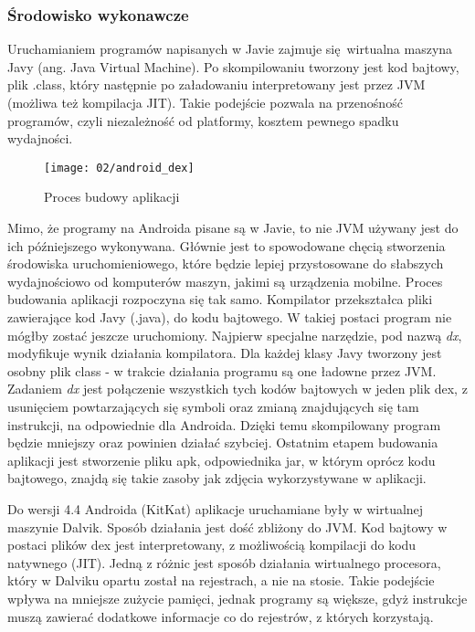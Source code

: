 \subsubsection*{Środowisko wykonawcze}
Uruchamianiem programów napisanych w Javie zajmuje się wirtualna maszyna Javy (ang. Java Virtual Machine). Po skompilowaniu tworzony jest kod bajtowy, plik .class, który następnie po załadowaniu interpretowany jest przez JVM (możliwa też kompilacja JIT). Takie podejście pozwala na przenośność programów, czyli niezależność od platformy, kosztem pewnego spadku wydajności.

\begin{wrapfigure}[5]{r}{0.5\textwidth}
	\vspace{-15pt}
	\begin{center}
		\texttt{[image: 02/android\_dex]}
	\end{center}
	\vspace{-10pt}
	\caption{Proces budowy aplikacji}
	\vspace{-10pt}
\end{wrapfigure}
Mimo, że programy na Androida pisane są w Javie, to nie JVM używany jest do ich późniejszego wykonywana. Głównie jest to spowodowane chęcią stworzenia środowiska uruchomieniowego, które będzie lepiej przystosowane do słabszych wydajnościowo od komputerów maszyn, jakimi są urządzenia mobilne. Proces budowania aplikacji rozpoczyna się tak samo. Kompilator przekształca pliki zawierające kod Javy (.java), do kodu bajtowego. W takiej postaci program nie mógłby zostać jeszcze uruchomiony. Najpierw specjalne narzędzie, pod nazwą \textit{dx}, modyfikuje wynik działania kompilatora. Dla każdej klasy Javy tworzony jest osobny plik class - w trakcie działania programu są one ładowne przez JVM. Zadaniem \textit{dx} jest połączenie wszystkich tych kodów bajtowych w jeden plik dex, z usunięciem powtarzających się symboli oraz zmianą znajdujących się tam instrukcji, na odpowiednie dla Androida. Dzięki temu skompilowany program będzie mniejszy oraz powinien działać szybciej. Ostatnim etapem budowania aplikacji jest stworzenie pliku apk, odpowiednika jar, w którym oprócz kodu bajtowego, znajdą się takie zasoby jak zdjęcia wykorzystywane w aplikacji.

Do wersji 4.4 Androida (KitKat) aplikacje uruchamiane były w wirtualnej maszynie Dalvik. Sposób działania jest dość zbliżony do JVM. Kod bajtowy w postaci plików dex jest interpretowany, z możliwością kompilacji do kodu natywnego (JIT). Jedną z różnic jest sposób działania wirtualnego procesora, który w Dalviku opartu został na rejestrach, a nie na stosie. Takie podejście wpływa na mniejsze zużycie pamięci, jednak programy są większe, gdyż instrukcje muszą zawierać dodatkowe informacje co do rejestrów, z których korzystają.

